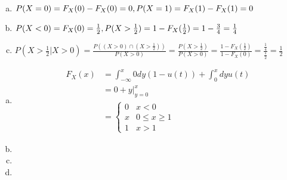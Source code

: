 \documentclass[12pt]{article}
\newenvironment{problem}[2][Problem]{\begin{trivlist}
\item[\hskip \labelsep {\bfseries #1}\hskip \labelsep {\bfseries #2.}]
  \vspace{1 cm}
}{\end{trivlist}}
\begin{document}
\begin{problem}{3.7} %
\item

\end{problem}

\begin{problem}{3.9}
\item
  \begin{enumerate}[a.]
    \item %
      $P(X = 0) = F_X(0)-F_X(0) = 0, \\ P(X=1) = F_X(1)-F_X(1) = 0$
    \item %
      $P(X < 0) = F_X(0) = \frac{1}{2}, \\
      P(X>\frac{1}{2}) = 1 - F_X(\frac{1}{2}) = 1-\frac{3}{4} = \frac{1}{4}$
    \item %
      $P(X>\frac{1}{2} | X > 0) = \frac{P((X > 0)\cap(X >\frac{1}{2}))}{P(X>0)}
      = \frac{P(X>\frac{1}{2})}{P(X>0)} = \frac{1-F_X(\frac{1}{2})}{1-F_X(0)} 
      = \frac{\frac{1}{4}}{\frac{1}{2}} = \frac{1}{2}$ 
  \end{enumerate}
\end{problem}

\begin{problem}{3.11} %
\item
  \begin{enumerate}[a.]
    \item %
      \begin{align*}
        F_X(x) &= \int_{-\infty}^{x} 0dy(1-u(t)) + \int_{0}^{x} dy u(t) \\
        &= 0 + y\big|_{y=0}^x \\
        &=\begin{cases}
            0 & x < 0 \\
            x & 0\leq x \geq 1 \\
            1 & x > 1
          \end{cases}
      \end{align*}
    \item %
    \item %

    \item %
  \end{enumerate}
\end{problem}
\end{document}
